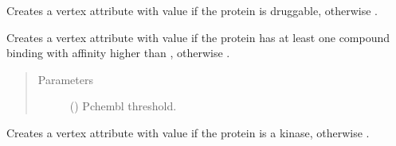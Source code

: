 \documentclass[letterpaper,10pt,english]{sphinxmanual}
\begin{document}
\begin{fulllineitems}
\begin{fulllineitems}
\begin{quote}
\begin{description}
\end{description}\end{quote}

\end{fulllineitems}


\begin{fulllineitems}
\label{\detokenize{reference:pypath.main.PyPath.set_druggability}}
Creates a vertex attribute  with value  if
the protein is druggable, otherwise .

\end{fulllineitems}


\begin{fulllineitems}
\label{\detokenize{reference:pypath.main.PyPath.set_drugtargets}}
Creates a vertex attribute  with value  if
the protein has at least one compound binding with
affinity higher than , otherwise .
\begin{quote}\begin{description}
\item[{Parameters}] \leavevmode
{} () \textendash{} Pchembl threshold.

\end{description}\end{quote}

\end{fulllineitems}


\begin{fulllineitems}
\label{\detokenize{reference:pypath.main.PyPath.set_kinases}}
Creates a vertex attribute  with value  if
the protein is a kinase, otherwise .


\end{fulllineitems}
\end{fulllineitems}
\end{document}
